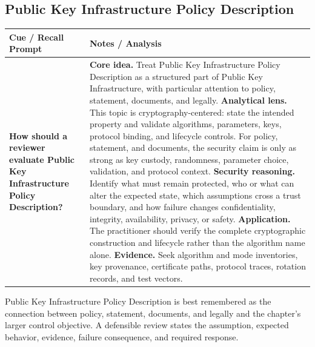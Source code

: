 \documentclass[11pt]{article}
\newcommand{\CornellHeader}{%
\rowcolor{Navy}\color{white}\bfseries Cue / Recall Prompt & \color{white}\bfseries Notes / Analysis\\\hline}
\newcommand{\CornellRow}[2]{%
\cellcolor{CueGray}\RaggedRight\textbf{#1} & \RaggedRight #2\\\hline}
\begin{document}
\subsection*{Public Key Infrastructure Policy Description}
\begin{longtable}{>{\RaggedRight\arraybackslash}p{}|>{\RaggedRight\arraybackslash}p{}}
\CornellHeader
\CornellRow{How should a reviewer evaluate Public Key Infrastructure Policy Description?}{\textbf{Core idea.} Treat Public Key Infrastructure Policy Description as a structured part of Public Key Infrastructure, with particular attention to policy, statement, documents, and legally. \textbf{Analytical lens.} This topic is cryptography-centered: state the intended property and validate algorithms, parameters, keys, protocol binding, and lifecycle controls. For policy, statement, and documents, the security claim is only as strong as key custody, randomness, parameter choice, validation, and protocol context. \textbf{Security reasoning.} Identify what must remain protected, who or what can alter the expected state, which assumptions cross a trust boundary, and how failure changes confidentiality, integrity, availability, privacy, or safety. \textbf{Application.} The practitioner should verify the complete cryptographic construction and lifecycle rather than the algorithm name alone. \textbf{Evidence.} Seek algorithm and mode inventories, key provenance, certificate paths, protocol traces, rotation records, and test vectors.}
\end{longtable}
\begin{topicsummary}
Public Key Infrastructure Policy Description is best remembered as the connection between policy, statement, documents, and legally and the chapter's larger control objective. A defensible review states the assumption, expected behavior, evidence, failure consequence, and required response.
\end{topicsummary}
\end{document}
